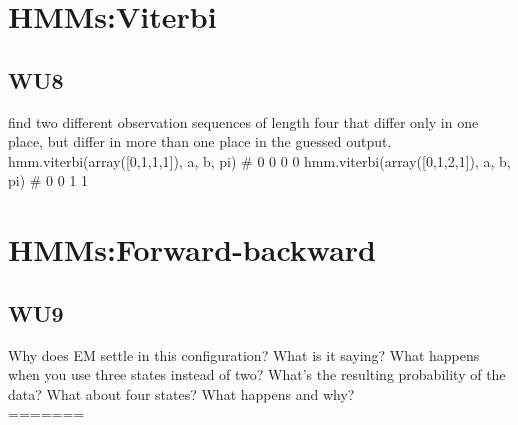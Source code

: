 \documentclass[a4paper,11pt]{article}
\begin{document}
\section{HMMs:Viterbi}
\subsection{WU8}
\textsf{find two different observation sequences of length four that
differ only in one place, but differ in more than one place in the
guessed output.}
hmm.viterbi(array([0,1,1,1]), a, b, pi) # 0 0 0 0
hmm.viterbi(array([0,1,2,1]), a, b, pi) # 0 0 1 1

\section{HMMs:Forward-backward}
\subsection{WU9}
\textsf{Why does EM settle in this configuration? What is it saying? What happens when you use three states instead of two? What's the resulting probability of the data? What about four states? What happens and why?}\\

=======
\usepackage{subfig}
\end{document}
